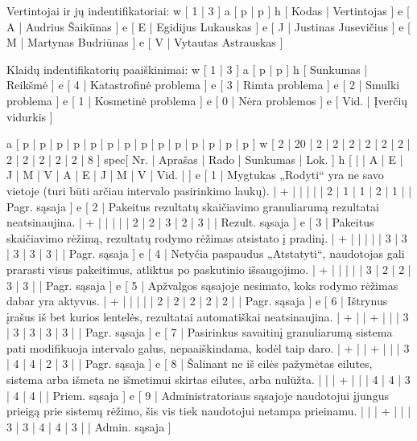 Vertintojai ir jų indentifikatoriai:
\xtableu
{
  w [ 1 | 3 ]
  a [ p | p ]
  h [ Kodas | Vertintojas ]
  e [ A | Audrius Šaikūnas ]
  e [ E | Egidijus Lukauskas ]
  e [ J | Justinas Jusevičius ]
  e [ M | Martynas Budriūnas ]
  e [ V | Vytautas Astrauskas ]
}

Klaidų indentifikatorių paaiškinimai:
\xtableu
{
  w [ 1 | 3 ]
  a [ p | p ]
  h [ Sunkumas | Reikšmė ]
  e [ 4 | Katastrofinė problema ]
  e [ 3 | Rimta problema ]
  e [ 2 | Smulki problema ]
  e [ 1 | Kosmetinė problema ]
  e [ 0 | Nėra problemos ]
  e [ Vid. | Įverčių vidurkis ]
}

\xtableu
{
  a [ p   | p       | p | p | p | p | p | p | p | p | p | p | p    | p    ]
  w [ 2   | 20      | 2 | 2 | 2 | 2 | 2 | 2 | 2 | 2 | 2 | 2 | 2    | 8    ]
spec[ Nr. | Aprašas | Rado              | Sunkumas                 | Lok. ]
  h [     |         | A | E | J | M | V | A | E | J | M | V | Vid. |      ]
  e [ 1   | Mygtukas „Rodyti“ yra ne savo vietoje (turi būti arčiau intervalo
  pasirinkimo laukų).
                    | + |   |   |   |   | 2 | 1 | 1 | 2 | 1 |      | Pagr. sąsaja ]
  e [ 2   | Pakeitus rezultatų skaičiavimo granuliarumą rezultatai neatsinaujina.
                    | + |   |   |   |   | 2 | 2 | 3 | 2 | 3 |      | Rezult. sąsaja ]
  e [ 3   | Pakeitus skaičiavimo rėžimą, rezultatų rodymo rėžimas atsistato
  į pradinį.
                    | + |   |   |   |   | 3 | 3 | 3 | 3 | 3 |      | Pagr. sąsaja ]
  e [ 4   | Netyčia paspaudus „Atstatyti“, naudotojas gali prarasti visus pakeitimus,
  atliktus po paskutinio išsaugojimo.
                    | + |   |   |   |   | 3 | 2 | 2 | 3 | 3 |      | Pagr. sąsaja ]
  e [ 5   | Apžvalgos sąsajoje nesimato, koks rodymo rėžimas dabar yra aktyvus.
                    | + |   |   |   |   | 2 | 2 | 2 | 2 | 2 |      | Pagr. sąsaja ]
  e [ 6   | Ištrynus įrašus iš bet kurios lentelės, rezultatai automatiškai neatsinaujina.
                    | + |   | + |   |   | 3 | 3 | 3 | 3 | 3 |      | Pagr. sąsaja ]
  e [ 7   | Pasirinkus savaitinį granuliarumą sistema pati modifikuoja intervalo galus,
  nepaaiškindama, kodėl taip daro.
                    | + |   | + |   |   | 3 | 4 | 4 | 2 | 3 |      | Pagr. sąsaja ]
  e [ 8   | Šalinant ne iš eilės pažymėtas eilutes, sistema arba išmeta ne išmetimui
  skirtas eilutes, arba nulūžta.
                    |   |   | + |   |   | 4 | 4 | 3 | 4 | 4 |      | Priem. sąsaja ]
  e [ 9   | Administratoriaus sąsajoje naudotojui įjungus prieigą prie sistemų
  rėžimo, šis vis tiek naudotojui netampa prieinamu.
                    |   |   | + |   |   | 3 | 3 | 4 | 4 | 3 |      | Admin. sąsaja ]
}
